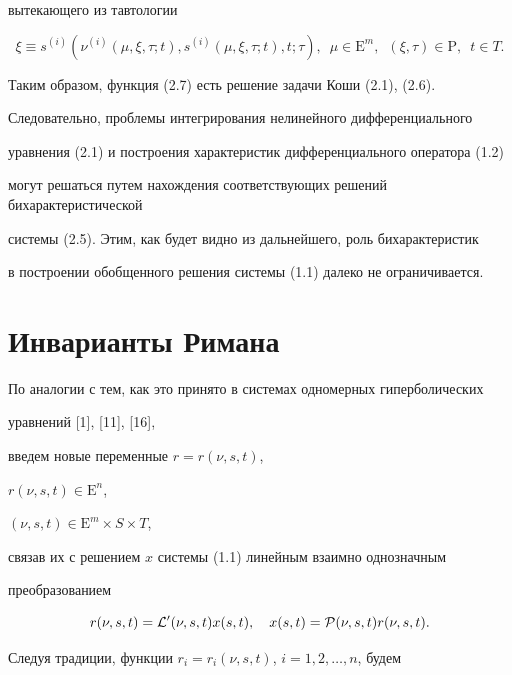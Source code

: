 вытекающего из тавтологии 


$$


\xi \equiv s^{(i)}(\nu^{(i)}(\mu,\xi,\tau;t), 


s^{(i)} (\mu,\xi,\tau;t),t;\tau),\ \; \mu \in {\mathrm E}^m, 


\ \; (\xi,\tau) \in {\mathrm P},\ \; t \in T.


$$


Таким образом, функция (2.7) есть решение задачи Коши (2.1), (2.6). 


Следовательно, проблемы интегрирования нелинейного дифференциального 


уравнения (2.1) и построения характеристик дифференциального оператора (1.2)


могут решаться путем нахождения соответствующих решений бихарактеристической 


системы (2.5). Этим, как будет видно из дальнейшего, роль бихарактеристик


в построении обобщенного решения системы (1.1) далеко не ограничивается.





\section{Инварианты Римана}





По аналогии с тем, как это принято в системах одномерных гиперболических 


уравнений [1], [11], [16],


введем новые переменные $r=r(\nu,s,t)$,


$r(\nu,s,t) \in {\mathrm E}^n$,


$(\nu,s,t) \in {\mathrm E}^m \times S \times T$,


связав их с решением $x$ системы (1.1) линейным взаимно однозначным 


преобразованием 


\begin{equation}


r(\nu,s,t)={\cal L}^{\prime}(\nu,s,t) x(s,t),\quad


x(s,t)={\cal P}(\nu,s,t) r(\nu,s,t).


\end{equation}


Следуя традиции, функции $r_i=r_i(\nu,s,t)$, $i=1,2,\dotsc,n$, будем


